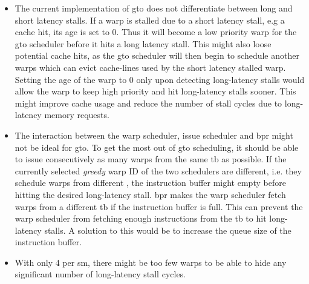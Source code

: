 \begin{itemize}
    \item The current implementation of \acrshort{gto} does not differentiate between long and short latency stalls. If a warp is stalled due to a short latency stall, e.g a cache hit, its age is set to 0. Thus it will become a low priority warp for the \acrshort{gto} scheduler before it hits a long latency stall. This might also loose potential cache hits, as the \acrshort{gto} scheduler will then begin to schedule another warps which can evict cache-lines used by the short latency stalled warp. Setting the age of the warp to 0 only upon detecting long-latency stalls would allow the warp to keep high priority and hit long-latency stalls sooner. This might improve cache usage and reduce the number of stall cycles due to long-latency memory requests. 
    \item The interaction between the warp scheduler, issue scheduler and \acrshort{bpr} might not be ideal for \acrshort{gto}. To get the most out of \acrshort{gto} scheduling, it should be able to issue consecutively as many warps from the same \acrshort{tb} as possible. If the currently selected \textit{greedy} warp ID of the two schedulers are different, i.e. they schedule warps from different , the instruction buffer might empty before hitting the desired long-latency stall. \acrshort{bpr} makes the warp scheduler fetch warps from a different \acrshort{tb} if the instruction buffer is full. This can prevent the warp scheduler from fetching enough instructions from the \acrshort{tb} to hit long-latency stalls. A solution to this would be to increase the queue size of the instruction buffer.  
    \item With only 4  per \acrshort{sm}, there might be too few warps to be able to hide any significant number of long-latency stall cycles.
\end{itemize}




